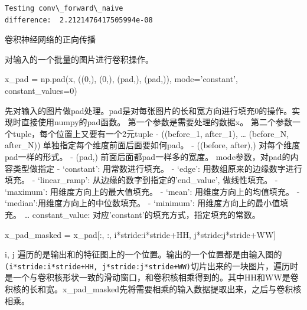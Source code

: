 \documentclass[11pt]{article}
\newenvironment{Shaded}{}{}
\newcommand{\DecValTok}[1]{\textcolor[rgb]{0.25,0.63,0.44}{{#1}}}
\newcommand{\StringTok}[1]{\textcolor[rgb]{0.25,0.44,0.63}{{#1}}}
\newcommand{\NormalTok}[1]{{#1}}
\newcommand{\OperatorTok}[1]{\textcolor[rgb]{0.40,0.40,0.40}{{#1}}}
\begin{document}
    \begin{Verbatim}[commandchars=\\\{\}]
Testing conv\_forward\_naive
difference:  2.2121476417505994e-08

    \end{Verbatim}

    卷积神经网络的正向传播

对输入的一个批量的图片进行卷积操作。

\begin{Shaded}
\begin{Highlighting}[]
\NormalTok{x_pad }\OperatorTok{=}\NormalTok{ np.pad(x, ((}\DecValTok{0}\NormalTok{,), (}\DecValTok{0}\NormalTok{,), (pad,), (pad,)), mode}\OperatorTok{=}\StringTok{'constant'}\NormalTok{, constant_values}\OperatorTok{=}\DecValTok{0}\NormalTok{)}
\end{Highlighting}
\end{Shaded}


先对输入的图片做pad处理。pad是对每张图片的长和宽方向进行填充0的操作。实现时直接使用numpy的pad函数。
第一个参数是需要处理的数据x。
第二个参数一个tuple，每个位置上又要有一个2元tuple - ((before\_1,
after\_1), \ldots{} (before\_N, after\_N))
单独指定每个维度前面后面要如何pad。 - ((before, after),)
对每个维度pad一样的形式。 - (pad,) 前面后面都pad一样多的宽度。
mode参数，对pad的内容类型做指定 - `constant': 用常数进行填充。 - `edge':
用数组原来的边缘数字进行填充。 - `linear\_ramp':
从边缘的数字到指定的'end\_value', 做线性填充。 - `maximum':
用维度方向上的最大值填充。 - `mean': 用维度方向上的均值填充。 -
`median':用维度方向上的中位数填充。 - `minimum':
用维度方向上的最小值填充。 \ldots{} constant\_value:
对应'constant'的填充方式，指定填充的常数。

\begin{Shaded}
\begin{Highlighting}[]
\NormalTok{x_pad_masked }\OperatorTok{=}\NormalTok{ x_pad[:, :, i}\OperatorTok{*}\NormalTok{stride:i}\OperatorTok{*}\NormalTok{stride}\OperatorTok{+}\NormalTok{HH, j}\OperatorTok{*}\NormalTok{stride:j}\OperatorTok{*}\NormalTok{stride}\OperatorTok{+}\NormalTok{WW]}
\end{Highlighting}
\end{Shaded}

 i, j
遍历的是输出和的特征图上的一个位置。输出的一个位置都是由输入图的\texttt{(i*stride:i*stride+HH,\ j*stride:j*stride+WW)}切片出来的一块图片，遍历时是一个与卷积核形状一致的滑动窗口，和卷积核相乘得到的。其中HH和WW是卷积核的长和宽。x\_pad\_masked先将需要相乘的输入数据提取出来，之后与卷积核相乘。
\end{document}

